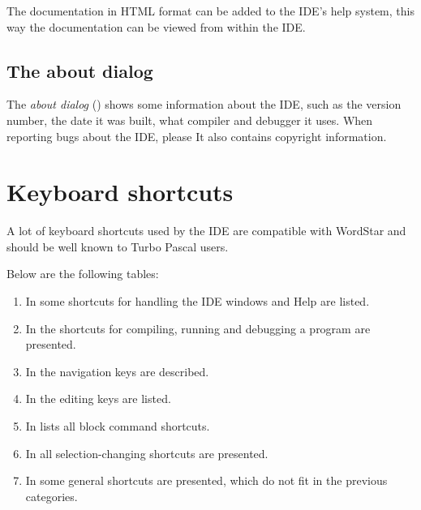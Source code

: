 The \fpc documentation in HTML format can be added to the IDE's help system,
this way the documentation can be viewed from within the IDE.

%
%
\subsection{The about dialog}
\label{se:about}
The \emph{about dialog} () shows some information
about the IDE, such as the version number, the date it was built, what
compiler and debugger it uses. When reporting bugs about the IDE, please 
It also contains copyright information.


\section{Keyboard shortcuts}
\label{se:keyshortcuts}
A lot of keyboard shortcuts used by the IDE are compatible with 
WordStar and should be well known to Turbo Pascal users.

Below are the following tables:
\begin{enumerate}
\item In  some shortcuts for handling the IDE windows
and Help are listed.
\item In  the shortcuts for compiling, running and
debugging a program are presented.
\item In  the navigation keys are described.
\item In  the editing keys are listed.
\item In  lists all block command shortcuts.
\item In  all selection-changing shortcuts are 
presented.
\item In  some general shortcuts are presented, 
which do not fit in the previous categories.
\end{enumerate}

